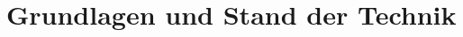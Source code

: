 \newpage
\section{Grundlagen und Stand der Technik} \label{sec:Grundlagen und Stand der Technik} %

